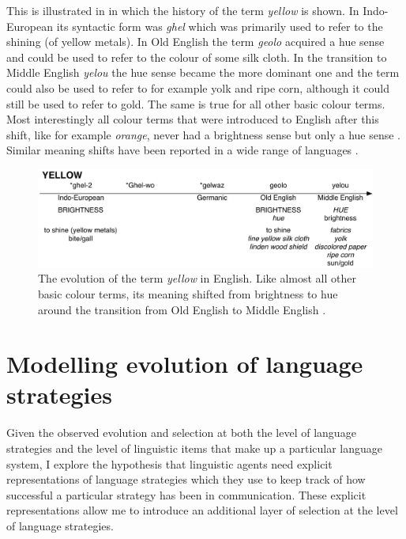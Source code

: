 This is illustrated in  in which the
history of the term \textit{yellow} is shown. In Indo-European its
syntactic form was \textit{ghel} which was primarily used to refer to the
shining (of yellow metals). In Old English the term \textit{geolo} acquired
a hue sense and could be used to refer to the colour of some silk
cloth. In the transition to Middle English \textit{yelou} the hue sense
became the more dominant one and the term could also be used to refer
to for example yolk and ripe corn, although it could still be used to
refer to gold. The same is true for all other basic colour terms. Most
interestingly all colour terms that were introduced to English after
this shift, like for example \textit{orange}, never had a brightness sense
but only a hue sense \citep{casson97shift}. Similar meaning shifts
have been reported in a wide range of languages
\citep{maclaury92brightness}.

\begin{figure}
  \begin{center}
   \includegraphics[width=.8\textwidth]{./intro/figures/history-yellow.pdf}
   \caption[The evolution of the term \textit{yellow} in English]{The
     evolution of the term \textit{yellow} in English. Like almost all
     other basic colour terms, its meaning shifted from brightness to
     hue around the transition from Old English to Middle
     English \citep{casson97shift}.}
    \label{f:history-yellow}
  \end{center}
\end{figure}

\section{Modelling evolution of language strategies}

Given the observed evolution and selection at both the level of
language strategies and the level of linguistic items that make up a
particular language system, I explore the hypothesis that linguistic
agents need explicit representations of language strategies which they
use to keep track of how successful a particular strategy has been in
communication. These explicit representations allow me to introduce an
additional layer of selection at the level of language strategies.

